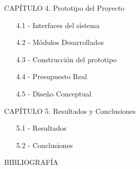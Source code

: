 \vspace{1em}
CAPÍTULO 4. Prototipo del Proyecto
\begin{enumerate}
  \item[4.1 -] Interfaces del sistema
  \item[4.2 -] Módulos Desarrollados
  \item[4.3 -] Construcción del prototipo
  \item[4.4 -] Presupuesto Real
  \item[4.5 -] Diseño Conceptual
\end{enumerate}

\vspace{1em}
CAPÍTULO 5. Resultados y Conclusiones
\begin{enumerate}
  \item[5.1 -] Resultados
  \item[5.2 -] Conclusiones
\end{enumerate}

\vspace{1em}
BIBLIOGRAFÍA
